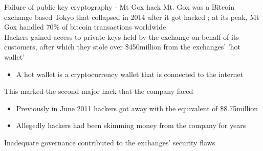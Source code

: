 \documentclass[9pt]{beamer}
\begin{document}





\begin{frame}{Failure of public key cryptography - Mt Gox hack}
	Mt. Gox was a Bitcoin exchange based Tokyo that collapsed in 2014 after it got hacked ; at its peak, Mt Gox handled 70\% of bitcoin transactions worldwide \\ \vspace{3mm}
	Hackers gained access to private keys held by the exchange on behalf of its customers, after which they stole over \$450million from the exchanges' 'hot wallet'
	\begin{itemize}
		\item A hot wallet is a cryptocurrency wallet that is connected to the internet
	\end{itemize}
	This marked the second major hack that the company faced
	\begin{itemize}
		\item Previously in June 2011 hackers got away with the equivalent of \$8.75million
		\item Allegedly hackers had been skimming money from the company for years
	\end{itemize}
	Inadequate governance contributed to the exchanges' security flaws
\end{frame}
\end{document}

